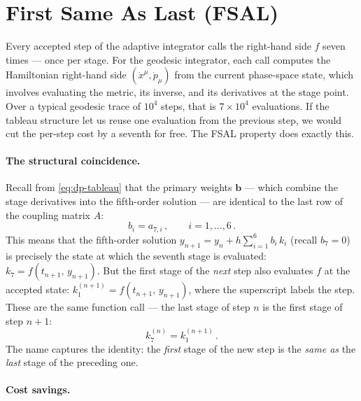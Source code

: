 \section{First Same As Last (FSAL)}
\label{sec:rk-fsal}

Every accepted step of the adaptive integrator calls the right-hand
side $f$ seven times --- once per stage.  For the geodesic integrator,
each call computes the Hamiltonian right-hand side
$(\dot{x}^\mu, \dot{p}_\mu)$ from the current phase-space state, which
involves evaluating the metric, its inverse, and its derivatives at
the stage point.  Over a typical geodesic trace of $10^4$ steps, that
is $7 \times 10^4$ evaluations.  If the tableau structure let us reuse
one evaluation from the previous step, we would cut the per-step cost
by a seventh for free.  The FSAL property does exactly this.

\paragraph{The structural coincidence.}

Recall from \cref{eq:dp-tableau} that the primary weights
$\mathbf{b}$ --- which combine the stage derivatives into the
fifth-order solution --- are identical to the last row of the coupling
matrix $A$:
%
\begin{equation}
  b_i = a_{7,i} \,, \qquad i = 1, \ldots, 6 \,.
  \label{eq:fsal-condition}
\end{equation}
%
This means that the fifth-order solution
$y_{n+1} = y_n + h\sum_{i=1}^{6} b_i\,k_i$ (recall $b_7 = 0$) is
precisely the state at which the seventh stage is evaluated:
$k_7 = f(t_{n+1},\, y_{n+1})$.  But the first stage of the
\emph{next} step also evaluates $f$ at the accepted state:
$k_1^{(n+1)} = f(t_{n+1},\, y_{n+1})$, where the superscript labels
the step.  These are the same function call --- the last stage of
step $n$ is the first stage of step $n+1$:
%
\begin{equation}
  k_7^{(n)} = k_1^{(n+1)} \,.
  \label{eq:fsal-reuse}
\end{equation}
%
The name captures the identity: the \emph{first} stage of the new step
is the \emph{same as} the \emph{last} stage of the preceding one.

\paragraph{Cost savings.}

